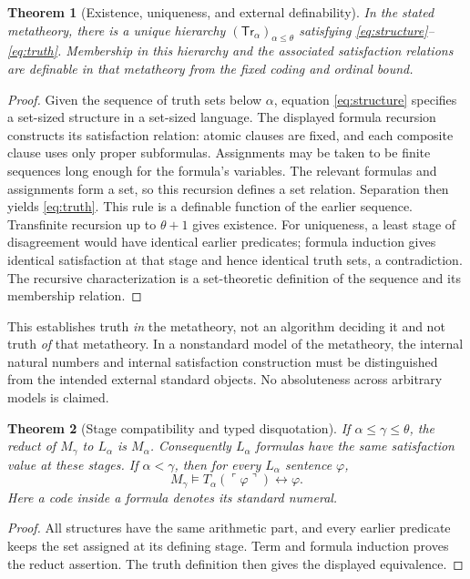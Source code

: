 \documentclass[11pt]{article}
\newtheorem{theorem}{Theorem}[section]
\theoremstyle{definition}
\newcommand{\code}[1]{\ulcorner #1\urcorner}
\begin{document}
\begin{theorem}[Existence, uniqueness, and external definability]
In the stated metatheory, there is a unique hierarchy $(\mathsf{Tr}_\alpha)_{\alpha\le\theta}$ satisfying \eqref{eq:structure}--\eqref{eq:truth}. Membership in this hierarchy and the associated satisfaction relations are definable in that metatheory from the fixed coding and ordinal bound.
\end{theorem}
\begin{proof}
Given the sequence of truth sets below $\alpha$, equation \eqref{eq:structure} specifies a set-sized structure in a set-sized language. The displayed formula recursion constructs its satisfaction relation: atomic clauses are fixed, and each composite clause uses only proper subformulas. Assignments may be taken to be finite sequences long enough for the formula's variables. The relevant formulas and assignments form a set, so this recursion defines a set relation. Separation then yields \eqref{eq:truth}. This rule is a definable function of the earlier sequence. Transfinite recursion up to $\theta+1$ gives existence. For uniqueness, a least stage of disagreement would have identical earlier predicates; formula induction gives identical satisfaction at that stage and hence identical truth sets, a contradiction. The recursive characterization is a set-theoretic definition of the sequence and its membership relation.
\end{proof}

This establishes truth \emph{in} the metatheory, not an algorithm deciding it and not truth \emph{of} that metatheory. In a nonstandard model of the metatheory, the internal natural numbers and internal satisfaction construction must be distinguished from the intended external standard objects. No absoluteness across arbitrary models is claimed.

\begin{theorem}[Stage compatibility and typed disquotation]
If $\alpha\le\gamma\le\theta$, the reduct of $M_\gamma$ to $L_\alpha$ is $M_\alpha$. Consequently $L_\alpha$ formulas have the same satisfaction value at these stages. If $\alpha<\gamma$, then for every $L_\alpha$ sentence $\varphi$,
\[
M_\gamma\models T_\alpha(\code{\varphi})\leftrightarrow\varphi.
\]
Here a code inside a formula denotes its standard numeral.
\end{theorem}
\begin{proof}
All structures have the same arithmetic part, and every earlier predicate keeps the set assigned at its defining stage. Term and formula induction proves the reduct assertion. The truth definition then gives the displayed equivalence.
\end{proof}
\end{document}
